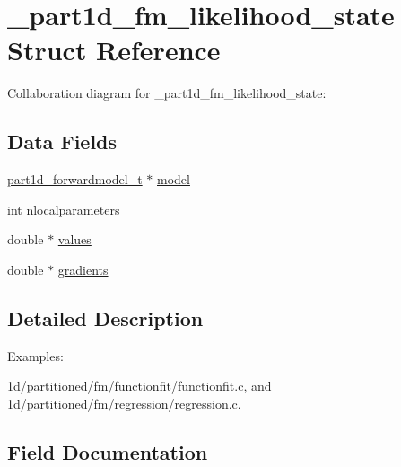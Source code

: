 \hypertarget{struct__part1d__fm__likelihood__state}{}\section{\+\_\+part1d\+\_\+fm\+\_\+likelihood\+\_\+state Struct Reference}
\label{struct__part1d__fm__likelihood__state}


Collaboration diagram for \+\_\+part1d\+\_\+fm\+\_\+likelihood\+\_\+state\+:
\subsection*{Data Fields}
\begin{DoxyCompactItemize}
\item 
\hyperlink{part1d__forwardmodel_8h_adaad64fbca97fa82ba80fe8371e4f1d9}{part1d\+\_\+forwardmodel\+\_\+t} $\ast$ \hyperlink{struct__part1d__fm__likelihood__state_a778c2db4eceda0bf01e2288deb3ab7f7}{model}
\item 
int \hyperlink{struct__part1d__fm__likelihood__state_a148f0a4b162f3a26f1ecb4c8a50e555d}{nlocalparameters}
\item 
double $\ast$ \hyperlink{struct__part1d__fm__likelihood__state_a7aef3ab9c718c1e724355a916bedb75c}{values}
\item 
double $\ast$ \hyperlink{struct__part1d__fm__likelihood__state_a1ed8d7d2f967d8b4a12f3d2d873999f1}{gradients}
\end{DoxyCompactItemize}


\subsection{Detailed Description}
\begin{Desc}
\item[Examples\+: ]\par
\hyperlink{1d_2partitioned_2fm_2functionfit_2functionfit_8c-example}{1d/partitioned/fm/functionfit/functionfit.\+c}, and \hyperlink{1d_2partitioned_2fm_2regression_2regression_8c-example}{1d/partitioned/fm/regression/regression.\+c}.\end{Desc}


\subsection{Field Documentation}
